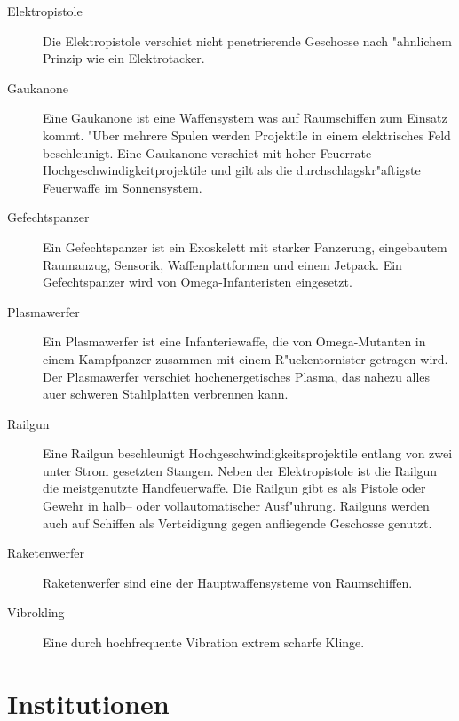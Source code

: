 \begin{description}
\item [Elektropistole] Die Elektropistole verschie\3t nicht penetrierende Geschosse nach "ahnlichem Prinzip wie ein
      Elektrotacker.
\item [Gau\3kanone] Eine Gau\3kanone ist eine Waffensystem was auf Raumschiffen zum Einsatz kommt. "Uber mehrere Spulen
      werden Projektile in einem elektrisches Feld beschleunigt. Eine Gau\3kanone verschie\3t mit hoher Feuerrate Hochgeschwindigkeitprojektile und gilt als die durchschlagskr"aftigste Feuerwaffe im Sonnensystem.
\item [Gefechtspanzer] Ein Gefechtspanzer ist ein Exoskelett mit starker Panzerung, eingebautem Raumanzug, Sensorik,
      Waffenplattformen und einem Jetpack. Ein Gefechtspanzer wird von Omega-Infanteristen eingesetzt.
\item [Plasmawerfer] Ein Plasmawerfer ist eine Infanteriewaffe, die von Omega-Mutanten in einem Kampfpanzer zusammen mit
      einem R"uckentornister getragen wird. Der Plasmawerfer verschie\3t hochenergetisches Plasma, das nahezu alles au\3er schweren Stahlplatten verbrennen kann.
\item [Railgun] Eine Railgun beschleunigt Hochgeschwindigkeitsprojektile entlang von zwei unter Strom gesetzten Stangen.
      Neben der Elektropistole ist die Railgun die meistgenutzte Handfeuerwaffe. Die Railgun gibt es als Pistole oder Gewehr in halb-- oder vollautomatischer Ausf"uhrung. Railguns werden auch auf Schiffen als Verteidigung gegen anfliegende Geschosse genutzt.
\item [Raketenwerfer] Raketenwerfer sind eine der Hauptwaffensysteme von Raumschiffen.
\item [Vibrokling] Eine durch hochfrequente Vibration extrem scharfe Klinge.
\end{description}

\section{Institutionen}

